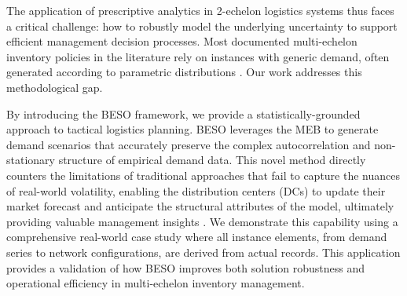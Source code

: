 \documentclass[review,a4paper,fleqn,3p,11pt,authoryear]{elsarticle}
\begin{document}
The application of prescriptive analytics in 2-echelon logistics systems thus faces a critical challenge: how to robustly model the underlying uncertainty to support efficient management decision processes. Most documented multi-echelon inventory policies in the literature rely on instances with generic demand, often generated according to parametric distributions \citep{Escorcia20,EG81}. Our work addresses this methodological gap.

By introducing the BESO framework, we provide a statistically-grounded approach to tactical logistics planning. BESO leverages the MEB to generate demand scenarios that accurately preserve the complex autocorrelation and non-stationary structure of empirical demand data. This novel method directly counters the limitations of traditional approaches that fail to capture the nuances of real-world volatility, enabling the distribution centers (DCs) to update their market forecast and anticipate the structural attributes of the model, ultimately providing valuable management insights \citep{P16}. We demonstrate this capability using a comprehensive real-world case study where all instance elements, from demand series to network configurations, are derived from actual records. This application provides a validation of how BESO improves both solution robustness and operational efficiency in multi-echelon inventory management.


\end{document}
